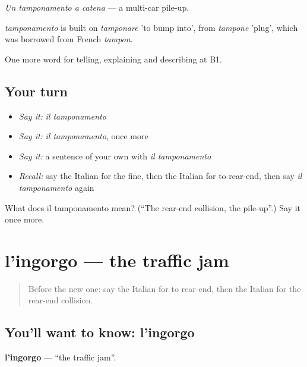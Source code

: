 \emph{Un tamponamento a catena} — a multi-car pile-up.

\begin{cousinweb}
\emph{tamponamento} is built on \emph{tamponare} 'to bump into', from \emph{tampone} 'plug', which was borrowed from French \emph{tampon}.
\end{cousinweb}

\begin{grammarlens}[title={What you've built}]
One more word for telling, explaining and describing at B1.
\end{grammarlens}

\subsection*{Your turn}
\begin{itemize}
\raggedright
  \item \emph{Say it:} \emph{il tamponamento}
  \item \emph{Say it:} \emph{il tamponamento}, once more
  \item \emph{Say it:} a sentence of your own with \emph{il tamponamento}
  \item \emph{Recall:} say the Italian for the fine, then the Italian for to rear-end, then say \emph{il tamponamento} again
\end{itemize}

\begin{tcolorbox}[breakable,colback=teal!4,colframe=teal!35!black,title={Before you move on}]
What does il tamponamento mean? (\textquotedblleft{}The rear-end collision, the pile-up\textquotedblright{}.) Say it once more.
\end{tcolorbox}
\section[l'ingorgo]{l'ingorgo — the traffic jam}

\label{lesson:IT-C413-ingorgo}



\begin{quote}
Before the new one: say the Italian for to rear-end, then the Italian for the rear-end collision.
\end{quote}

\subsection*{You'll want to know: l'ingorgo}
\textbf{l'ingorgo} — \textquotedblleft{}the traffic jam\textquotedblright{}.

